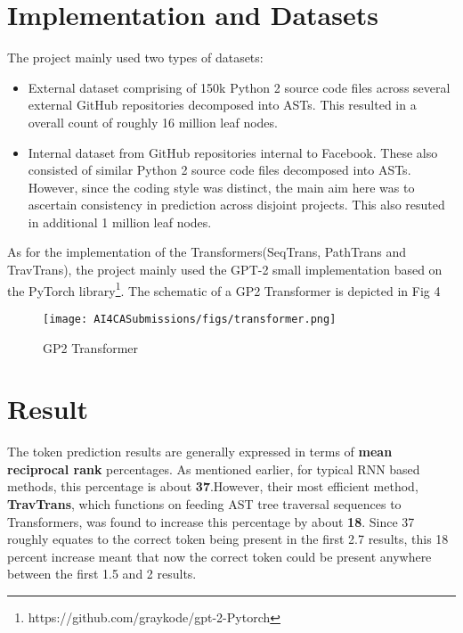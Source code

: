 \documentclass[sigplan,screen,9pt]{acmart}
\begin{document}
\section{Implementation and Datasets}
The project mainly used two types of datasets:\cite{FeedTree}
\begin{itemize}
    \item External dataset comprising of 150k Python 2 source code files across several external GitHub repositories decomposed into ASTs. This resulted in a overall count of roughly 16 million leaf nodes.
    \item Internal dataset from GitHub repositories internal to Facebook. These also consisted of similar Python 2 source code files decomposed into ASTs. However, since the coding style was distinct, the main aim here was to ascertain consistency in prediction across disjoint projects. This also resuted in additional 1 million leaf nodes.
\end{itemize}
As for the implementation of the Transformers(SeqTrans, PathTrans and TravTrans), the project mainly used the GPT-2 small implementation\cite{radford2019language} based on the PyTorch library\footnote{https://github.com/graykode/gpt-2-Pytorch}. The schematic of a GP2 Transformer is depicted in Fig 4
\begin{figure}[h]
  \centering
  \texttt{[image: AI4CASubmissions/figs/transformer.png]}
  \caption{GP2 Transformer}
\end{figure}

\section{Result}
The token prediction results are generally expressed in terms of \textbf{mean reciprocal rank} percentages. As mentioned earlier, for typical RNN based methods, this percentage is about \textbf{37}.However, their most efficient method, \textbf{TravTrans}, which functions on feeding AST tree traversal sequences to Transformers, was found to increase this percentage by about \textbf{18}. Since 37 roughly equates to the correct token being present in the first 2.7 results, this 18 percent increase meant that now the correct token could be present anywhere between the first 1.5 and 2 results.





%
\end{document}
